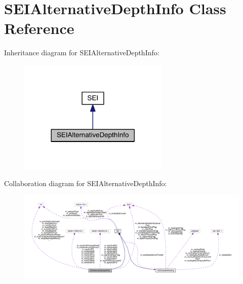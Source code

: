 \hypertarget{class_s_e_i_alternative_depth_info}{}\section{S\+E\+I\+Alternative\+Depth\+Info Class Reference}
\label{class_s_e_i_alternative_depth_info}


Inheritance diagram for S\+E\+I\+Alternative\+Depth\+Info\+:
\nopagebreak
\begin{figure}[H]
\begin{center}
\leavevmode
\includegraphics[width=203pt]{d7/d16/class_s_e_i_alternative_depth_info__inherit__graph}
\end{center}
\end{figure}


Collaboration diagram for S\+E\+I\+Alternative\+Depth\+Info\+:
\nopagebreak
\begin{figure}[H]
\begin{center}
\leavevmode
\includegraphics[width=350pt]{d9/d8a/class_s_e_i_alternative_depth_info__coll__graph}
\end{center}
\end{figure}
